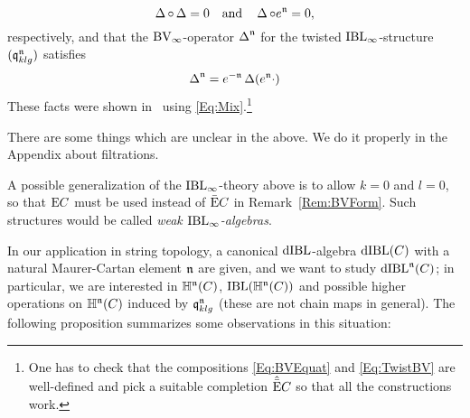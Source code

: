 \documentclass[\MainFolder/Text.tex]{subfiles}
\begin{document}
\begin{Remark}
\begin{equation}\label{Eq:BVEquat}
 \operatorname{\Delta}\circ \operatorname{\Delta} = 0\quad\text{and}\quad \operatorname{\Delta} \circ e^{\mathfrak{n}} = 0,
\end{equation}
respectively, and that the $\mathrm{BV}_\infty$-operator $\operatorname{\Delta}^{\mathfrak{n}}$ for the twisted $\mathrm{IBL}_\infty$-structure $(\mathfrak{q}_{klg}^{\mathfrak{n}})$ satisfies
\begin{equation} \label{Eq:TwistBV}
\operatorname{\Delta}^{\mathfrak{n}} = e^{-\mathfrak{n}}\operatorname{\Delta}(e^{\mathfrak{n}} \cdot)
\end{equation}
 These facts were shown in~\cite{Cieliebak2015} using \eqref{Eq:Mix}.\footnote{One has to check that the compositions \eqref{Eq:BVEquat} and \eqref{Eq:TwistBV} are well-defined and pick a suitable completion $\hat{\bar{\mathrm{E}}} C$ so that all the constructions work.}
 
There are some things which are unclear in the above. We do it properly in the Appendix about filtrations.
\end{Remark}

\begin{Remark}\label{Rem:Weak}
A possible generalization of the $\mathrm{IBL}_\infty$-theory above is to allow $k=0$ and $l=0$, so that $\mathrm{E} C$ must be used instead of $\bar{\mathrm{E}} C$ in Remark~\ref{Rem:BVForm}. Such structures would be called \emph{weak $\mathrm{IBL}_\infty$-algebras}.
\end{Remark}


In our application in string topology, a canonical $\mathrm{dIBL}$-algebra $\mathrm{dIBL}(C)$ with a natural Maurer-Cartan element $\mathfrak{n}$ are given, and we want to study $\mathrm{dIBL}^{\mathfrak{n}}(C)$; in particular, we are interested in $\mathbb{H}^{\mathfrak{n}}(C)$, $\mathrm{IBL}(\mathbb{H}^{\mathfrak{n}}(C))$ and possible higher operations on $\mathbb{H}^{\mathfrak{n}}(C)$ induced by $\mathfrak{q}_{klg}^{\mathfrak{n}}$ (these are not chain maps in general). The following proposition summarizes some observations in this situation:
\end{document}
